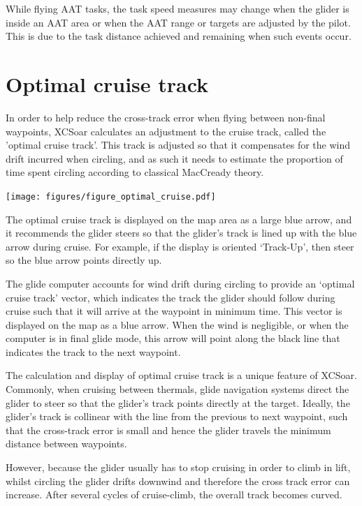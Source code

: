 While flying AAT tasks, the task speed measures may change when the
glider is inside an AAT area or when the AAT range or targets are
adjusted by the pilot.  This is due to the task distance achieved and
remaining when such events occur.


\section{Optimal cruise track}

In order to help reduce the cross-track error when flying between
non-final waypoints, XCSoar calculates an adjustment to the cruise
track, called the 'optimal cruise track'.  This track is adjusted so
that it compensates for the wind drift incurred when circling, and as
such it needs to estimate the proportion of time spent circling
according to classical MacCready theory.

\begin{center}
\begin{maxipage}
\centering
\def\svgwidth{0.8\linewidth}
\texttt{[image: figures/figure\_optimal\_cruise.pdf]}
\end{maxipage}
\end{center}

The optimal cruise track is displayed on the map area as a large blue
arrow, and it recommends the glider steers so that the glider's track
is lined up with the blue arrow during cruise.  For example, if the
display is oriented `Track-Up', then steer so the blue arrow points
directly up.

The glide computer accounts for wind drift during circling to provide
an `optimal cruise track' vector, which indicates the track the glider
should follow during cruise such that it will arrive at the waypoint
in minimum time.  This vector is displayed on the map as a blue arrow.
When the wind is negligible, or when the computer is in final glide
mode, this arrow will point along the black line that indicates the
track to the next waypoint.

The calculation and display of optimal cruise track is a unique
feature of XCSoar.  Commonly, when cruising between thermals, glide
navigation systems direct the glider to steer so that the glider's
track points directly at the target.  Ideally, the glider's track is
collinear with the line from the previous to next waypoint, such that
the cross-track error is small and hence the glider travels the
minimum distance between waypoints.

However, because the glider usually has to stop cruising in order to
climb in lift, whilst circling the glider drifts downwind and
therefore the cross track error can increase.  After several cycles of
cruise-climb, the overall track becomes curved.
%


